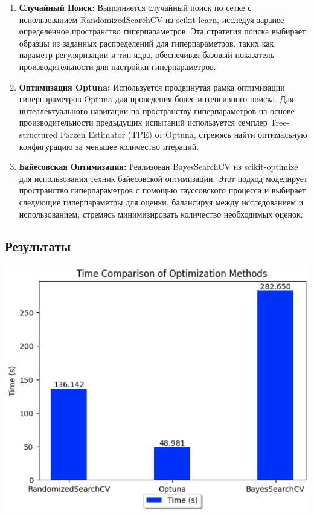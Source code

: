 \documentclass{article}
\begin{document}
\begin{enumerate}
\item \textbf{Случайный Поиск:} Выполняется случайный поиск по сетке с использованием RandomizedSearchCV из scikit-learn, исследуя заранее определенное пространство гиперпараметров. Эта стратегия поиска выбирает образцы из заданных распределений для гиперпараметров, таких как параметр регуляризации и тип ядра, обеспечивая базовый показатель производительности для настройки гиперпараметров.

\item \textbf{Оптимизация Optuna:} Используется продвинутая рамка оптимизации гиперпараметров Optuna для проведения более интенсивного поиска. Для интеллектуального навигации по пространству гиперпараметров на основе производительности предыдущих испытаний используется семплер Tree-structured Parzen Estimator (TPE) от Optuna, стремясь найти оптимальную конфигурацию за меньшее количество итераций.

\item \textbf{Байесовская Оптимизация:} Реализован BayesSearchCV из scikit-optimize для использования техник байесовской оптимизации. Этот подход моделирует пространство гиперпараметров с помощью гауссовского процесса и выбирает следующие гиперпараметры для оценки, балансируя между исследованием и использованием, стремясь минимизировать количество необходимых оценок.
\end{enumerate}



\subsection{Результаты}
\begin{center}
    \includegraphics[width=\textwidth]{figures/time.jpg}
\end{center}
\end{document}
